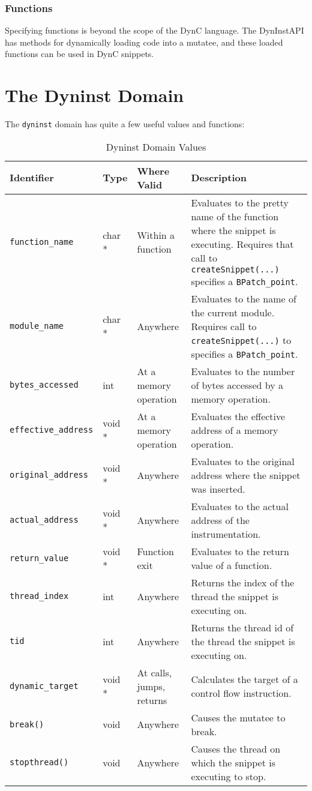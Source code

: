 \documentclass{article}
\begin{document}
\subsubsection{Functions}
Specifying functions is beyond the scope of the DynC language. The DynInstAPI has methods for dynamically loading code into a mutatee, and these loaded functions can be used in DynC snippets.
\pagebreak

\appendix
\section{The Dyninst Domain}
\label{sec:dyninstdomain}
The \verb!dyninst! domain has quite a few useful values and functions:

\begin{table}[!th]
\begin{tabular}{ | l | l | p{4cm} | p{6.5cm} |}
\hline
Identifier & Type & Where Valid & Description\\
\hline
\verb!function_name! & char * & Within a function & Evaluates to the pretty name of the function where the snippet is executing. Requires that call to \verb!createSnippet(...)! specifies a \verb!BPatch_point!.\\
\hline
\verb!module_name! & char * & Anywhere & Evaluates to the name of the current module. Requires call to \verb!createSnippet(...)! to specifies a \verb!BPatch_point!.\\
\hline
\verb!bytes_accessed! & int & At a memory operation & Evaluates to the number of bytes accessed by a memory operation.\\  
\hline
\verb!effective_address! & void * & At a memory operation & Evaluates the effective address of a memory operation.\\
\hline
\verb!original_address! & void * & Anywhere & Evaluates to the original address where the snippet was inserted. \\
\hline
\verb!actual_address! & void * & Anywhere & Evaluates to the actual address of the instrumentation. \\
\hline
\verb!return_value! & void * & Function exit & Evaluates to the return value of a function.\\ 
\hline
\verb!thread_index! & int & Anywhere &  Returns the index of the thread the snippet is executing on.\\
\hline
\verb!tid! & int & Anywhere & Returns the thread id of the thread the snippet is executing on.\\
\hline
\verb!dynamic_target! & void * & At calls, jumps, returns & Calculates the target of a control flow instruction.\\ 
\hline
\verb!break()! & void & Anywhere & Causes the mutatee to break.\\
\hline
\verb!stopthread()! & void & Anywhere & Causes the thread on which the snippet is executing to stop.\\
\hline

\end{tabular}
\caption{Dyninst Domain Values}
\end{table}
\end{document}
